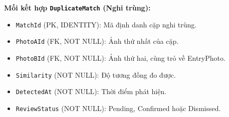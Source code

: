 \noindent\textbf{Mối kết hợp \texttt{DuplicateMatch} (Nghi trùng):}

\begin{itemize}
    \item \texttt{MatchId} (PK, IDENTITY): Mã định danh cặp nghi trùng.
    \item \texttt{PhotoAId} (FK, NOT NULL): Ảnh thứ nhất của cặp.
    \item \texttt{PhotoBId} (FK, NOT NULL): Ảnh thứ hai, cùng trỏ về EntryPhoto.
    \item \texttt{Similarity} (NOT NULL): Độ tương đồng đo được.
    \item \texttt{DetectedAt} (NOT NULL): Thời điểm phát hiện.
    \item \texttt{ReviewStatus} (NOT NULL): Pending, Confirmed hoặc Dismissed.
\end{itemize}

